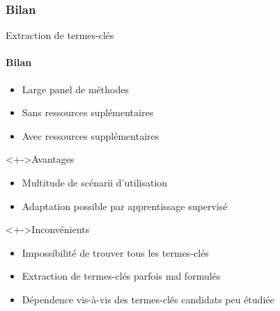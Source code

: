 \subsubsection{Bilan}
  \begin{frame}{Extraction de termes-clés}\framesubtitle{Bilan}
    \begin{itemize}
      \item<+->{Large panel de méthodes}
      \item<+->{Sans ressources suplémentaires}
      \item<+->{Avec ressources supplémentaires}
    \end{itemize}

    \vspace{1em}

    \begin{block}<+->{Avantages}
      \begin{itemize}
        \item{Multitude de scénarii d'utilisation}
        \item{Adaptation possible par apprentissage supervisé}
      \end{itemize}
    \end{block}

    \begin{alertblock}<+->{Inconvénients}
      \begin{itemize}
        \item{Impossibilité de trouver tous les termes-clés}
        \item{Extraction de termes-clés parfois mal formulés}
        \item{Dépendence vis-à-vis des termes-clés candidats peu étudiée}
      \end{itemize}
    \end{alertblock}
    
  \end{frame}

